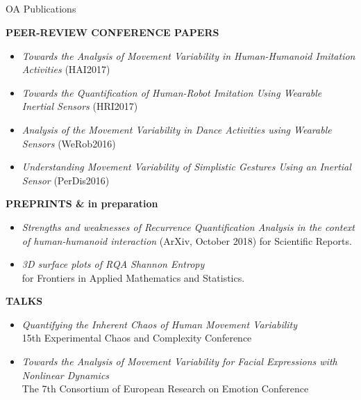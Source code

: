\subsection{}
{

\begin{frame}{OA Publications}

\tiny
 
\textbf{PEER-REVIEW CONFERENCE PAPERS}
\begin{itemize}	
	\item \textit{Towards the Analysis of Movement Variability in Human-Humanoid Imitation Activities} 
	(HAI2017) 
	\item \textit{Towards the Quantification of Human-Robot Imitation Using Wearable Inertial Sensors} (HRI2017)
	\item \textit{Analysis of the Movement Variability in Dance Activities using Wearable Sensors} (WeRob2016)
	\item \textit{Understanding Movement Variability of Simplistic Gestures Using an Inertial Sensor} (PerDis2016)
\end{itemize}

\textbf{PREPRINTS \& in preparation}
\begin{itemize}	
	\item \textit{Strengths and weaknesses of Recurrence Quantification Analysis in the context of human-humanoid interaction}
	(ArXiv, October 2018) for Scientific Reports.
	\item \textit{3D surface plots of RQA Shannon Entropy} \\
 	for Frontiers in Applied Mathematics and Statistics.
\end{itemize}

\textbf{TALKS}
\begin{itemize}	
	\item \textit{Quantifying the Inherent Chaos of Human Movement Variability} \\
	15th Experimental Chaos and Complexity Conference 
	\item \textit{Towards the Analysis of Movement Variability for Facial Expressions with
	Nonlinear Dynamics} \\
	The 7th Consortium of European Research on Emotion Conference 
\end{itemize}

	
\end{frame}
}




